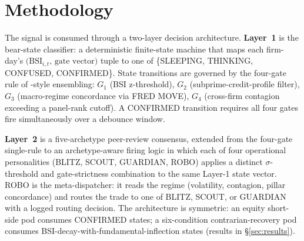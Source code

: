 \documentclass[11pt,a4paper]{article}
\begin{document}
\section{Methodology}\label{sec:method}

The signal is consumed through a two-layer decision architecture. \textbf{Layer~1} is the bear-state classifier: a deterministic finite-state machine that maps each firm-day's $\big(\text{BSI}_{i,t},\, \text{gate vector}\big)$ tuple to one of \{SLEEPING, THINKING, CONFUSED, CONFIRMED\}. State transitions are governed by the four-gate rule of \citet{ho1995random}-style ensembling: $G_1$ (BSI z-threshold), $G_2$ (subprime-credit-profile filter), $G_3$ (macro-regime concordance via FRED MOVE), $G_4$ (cross-firm contagion exceeding a panel-rank cutoff). A CONFIRMED transition requires all four gates fire simultaneously over a debounce window.

\textbf{Layer~2} is a five-archetype peer-review consensus, extended from the four-gate single-rule to an archetype-aware firing logic in which each of four operational personalities (BLITZ, SCOUT, GUARDIAN, ROBO) applies a distinct $\sigma$-threshold and gate-strictness combination to the same Layer-1 state vector. ROBO is the meta-dispatcher: it reads the regime (volatility, contagion, pillar concordance) and routes the trade to one of BLITZ, SCOUT, or GUARDIAN with a logged routing decision. The architecture is symmetric: an equity short-side pod consumes CONFIRMED states; a six-condition contrarian-recovery pod consumes BSI-decay-with-fundamental-inflection states (results in §\ref{sec:results}).
\end{document}
